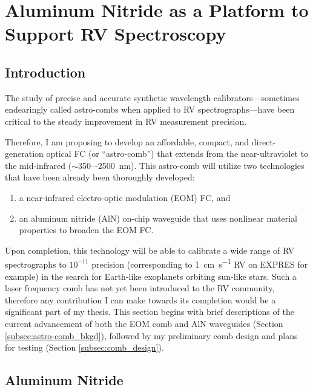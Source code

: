 \chapter{Aluminum Nitride as a Platform to Support RV Spectroscopy} \label{chapter:astro-comb}

\section{Introduction} \label{astro-comb:intro}

The study of precise and accurate synthetic wavelength calibrators---sometimes endearingly called astro-combs when applied to RV spectrographs---have been critical to the steady improvement in RV measurement precision.



Therefore, I am proposing to develop an affordable, compact, and direct-generation optical FC (or ``astro-comb'') that extends from the near-ultraviolet to the mid-infrared ($\sim$350–-\SI{2500}{\nano\meter}). This astro-comb will utilize two technologies that have been already been thoroughly developed:
\begin{enumerate}
    \item a near-infrared electro-optic modulation (EOM) FC, and
    \item an aluminum nitride (AlN) on-chip waveguide that uses nonlinear material properties to broaden the EOM FC.
\end{enumerate}
Upon completion, this technology will be able to calibrate a wide range of RV spectrographs to $10^{-11}$ precision (corresponding to \SI{1}{\centi\meter\per\second} RV on EXPRES for example) in the search for Earth-like exoplanets orbiting sun-like stars. Such a laser frequency comb has not yet been introduced to the RV community, therefore any contribution I can make towards its completion would be a significant part of my thesis. This section begins with brief descriptions of the current advancement of both the EOM comb and AlN waveguides (Section \ref{subsec:astro-comb_bkgd}), followed by my preliminary comb design and plans for testing (Section \ref{subsec:comb_design}).

\section{Aluminum Nitride} \label{astro-comb:intro:aln}

